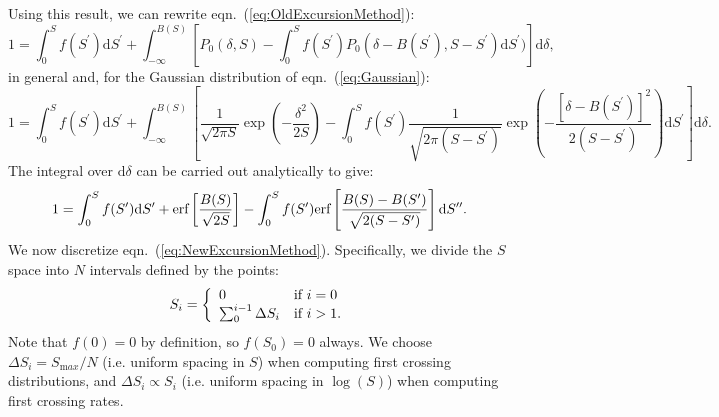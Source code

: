 Using this result, we can rewrite eqn.~(\ref{eq:OldExcursionMethod}):
\begin{equation}
  1 = \int_0^S f(S^\prime){\mathrm d}S^\prime + \int_{-\infty}^{B(S)} \left[ P_0(\delta,S) -  \int_{0}^{S} f(S^\prime) P_0(\delta - B(S^\prime),S - S^\prime){\mathrm d}S^\prime )\right] {\mathrm d} \delta ,
\end{equation}
in general and, for the Gaussian distribution of eqn.~(\ref{eq:Gaussian}):
\begin{equation}
  1 =  \int_0^S f(S^\prime){\mathrm d}S^\prime + \int_{-\infty}^{B(S)} \left[ \frac{1}{\sqrt{2 \pi S}} \exp\left(-\frac{\delta^2}{2 S}\right) -  \int_{0}^{S} f(S^\prime) \frac{1}{\sqrt{2 \pi (S-S^\prime)}} \exp\left(-\frac{[\delta - B(S^\prime)]^2}{2 (S-S^\prime)}\right){\mathrm d}S^\prime \right] {\mathrm d} \delta .
\end{equation}
The integral over ${\mathrm d}\delta$ can be carried out analytically to give:
\begin{equation}
 1 =  \int_0^S f(S^\prime){\mathrm d}S^\prime+  \hbox{erf}\left[\frac{B(S)}{\sqrt{2S}}\right]  -  \int_{0}^{S}  f(S^\prime)  \hbox{erf}\left[\frac{B(S) - B(S^\prime)}{\sqrt{2 (S-S^\prime)}}\right] {\mathrm d}S^{\prime\prime}.
\label{eq:NewExcursionMethod}
\end{equation}
We now discretize eqn.~(\ref{eq:NewExcursionMethod}). Specifically, we divide the $S$ space into $N$ intervals defined by the points:
\begin{equation}
  S_i = \left\{ \begin{array}{ll}
                 0 & \hbox{if } i=0 \\
                 \sum_0^{i-1} \Delta S_i & \hbox{if } i > 1.
                \end{array}
        \right.
\end{equation}
Note that $f(0)=0$ by definition, so $f(S_0)=0$ always. We choose $\Delta S_i = S_{\mathrm max}/N$ (i.e. uniform spacing in $S$) when computing first crossing distributions, and $\Delta S_i \propto S_i$ (i.e. uniform spacing in $\log(S)$) when computing first crossing rates.

